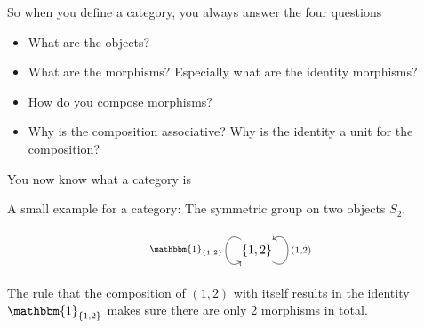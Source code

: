 \documentclass[12pt,compress]{beamer}
\begin{document}
\begin{frame}
So when you define a category, you always answer the four questions
\begin{itemize}[<.->]
\item What are the objects?
\item What are the morphisms? Especially what are the identity morphisms?
\item How do you compose morphisms?
\item Why is the composition associative? Why is the identity a unit for the composition?
\end{itemize}
\end{frame}
\begin{frame}
\begin{centering}
You now know what a category is
\end{centering}
\end{frame}
\begin{frame}
A small example for a category: The symmetric group on two objects $S_{2}$.
\[
\begin{tikzcd}
{\{1,2\}} \arrow["{\mathbbm{1}_{\{1,2\}}}"', loop, distance=2em, in=215, out=145] \arrow["{(1,2)}"', loop, distance=2em, in=35, out=325]
\end{tikzcd}
\]
The rule that the composition of $(1,2)$ with itself results in the identity $\mathbbm{1}_{\{1,2\}}$ makes sure there are only 2 morphisms in total.\\

\end{frame}
\end{document}
